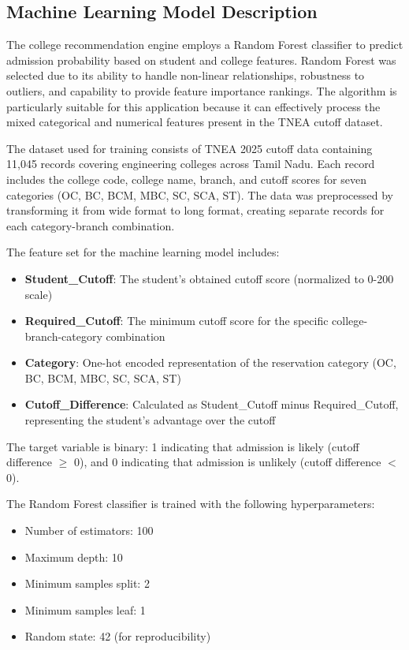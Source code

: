 \documentclass[journal]{IEEEtran}
\begin{document}
\subsection{Machine Learning Model Description}

The college recommendation engine employs a Random Forest classifier to predict admission probability based on student and college features. Random Forest was selected due to its ability to handle non-linear relationships, robustness to outliers, and capability to provide feature importance rankings. The algorithm is particularly suitable for this application because it can effectively process the mixed categorical and numerical features present in the TNEA cutoff dataset.

The dataset used for training consists of TNEA 2025 cutoff data containing 11,045 records covering engineering colleges across Tamil Nadu. Each record includes the college code, college name, branch, and cutoff scores for seven categories (OC, BC, BCM, MBC, SC, SCA, ST). The data was preprocessed by transforming it from wide format to long format, creating separate records for each category-branch combination.

The feature set for the machine learning model includes:

\begin{itemize}
\item \textbf{Student\_Cutoff}: The student's obtained cutoff score (normalized to 0-200 scale)
\item \textbf{Required\_Cutoff}: The minimum cutoff score for the specific college-branch-category combination
\item \textbf{Category}: One-hot encoded representation of the reservation category (OC, BC, BCM, MBC, SC, SCA, ST)
\item \textbf{Cutoff\_Difference}: Calculated as Student\_Cutoff minus Required\_Cutoff, representing the student's advantage over the cutoff
\end{itemize}

The target variable is binary: 1 indicating that admission is likely (cutoff difference $\geq$ 0), and 0 indicating that admission is unlikely (cutoff difference $<$ 0).

The Random Forest classifier is trained with the following hyperparameters:

\begin{itemize}
\item Number of estimators: 100
\item Maximum depth: 10
\item Minimum samples split: 2
\item Minimum samples leaf: 1
\item Random state: 42 (for reproducibility)
\end{itemize}
\end{document}
